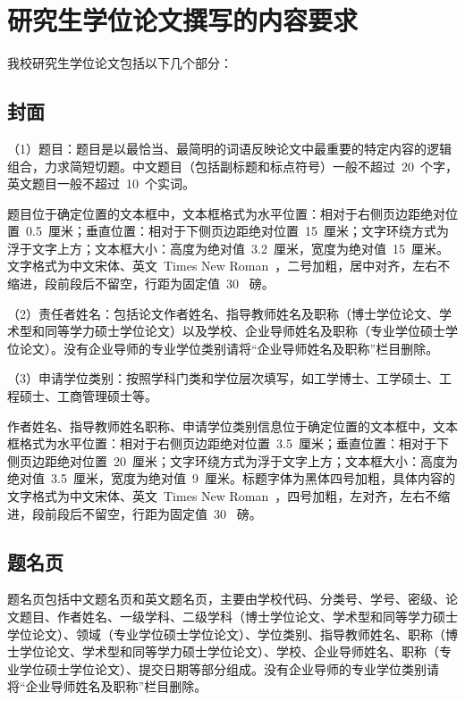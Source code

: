
\chapter{研究生学位论文撰写的内容要求}

我校研究生学位论文包括以下几个部分：

\section{封面}

（1）题目：题目是以最恰当、最简明的词语反映论文中最重要的特定内容的逻辑组合，力求简短切题。中文题目（包括副标题和标点符号）一般不超过~20~个字，英文题目一般不超过~10~个实词。

题目位于确定位置的文本框中，文本框格式为水平位置：相对于右侧页边距绝对位置~0.5~厘米；垂直位置：相对于下侧页边距绝对位置~15~厘米；文字环绕方式为浮于文字上方；文本框大小：高度为绝对值~3.2~厘米，宽度为绝对值~15~厘米。文字格式为中文宋体、英文~Times New Roman~，二号加粗，居中对齐，左右不缩进，段前段后不留空，行距为固定值~30~ 磅。

（2）责任者姓名：包括论文作者姓名、指导教师姓名及职称（博士学位论文、学术型和同等学力硕士学位论文）以及学校、企业导师姓名及职称（专业学位硕士学位论文）。没有企业导师的专业学位类别请将“企业导师姓名及职称”栏目删除。

（3）申请学位类别：按照学科门类和学位层次填写，如工学博士、工学硕士、工程硕士、工商管理硕士等。

作者姓名、指导教师姓名职称、申请学位类别信息位于确定位置的文本框中，文本框格式为水平位置：相对于右侧页边距绝对位置~3.5~厘米；垂直位置：相对于下侧页边距绝对位置~20~厘米；文字环绕方式为浮于文字上方；文本框大小：高度为绝对值~3.5~厘米，宽度为绝对值~9~厘米。标题字体为黑体四号加粗，具体内容的文字格式为中文宋体、英文~Times New Roman~，四号加粗，左对齐，左右不缩进，段前段后不留空，行距为固定值~30~ 磅。

\section{题名页}

题名页包括中文题名页和英文题名页，主要由学校代码、分类号、学号、密级、论文题目、作者姓名、一级学科、二级学科（博士学位论文、学术型和同等学力硕士学位论文）、领域（专业学位硕士学位论文）、学位类别、指导教师姓名、职称（博士学位论文、学术型和同等学力硕士学位论文）、学校、企业导师姓名、职称（专业学位硕士学位论文）、提交日期等部分组成。没有企业导师的专业学位类别请将“企业导师姓名及职称”栏目删除。

